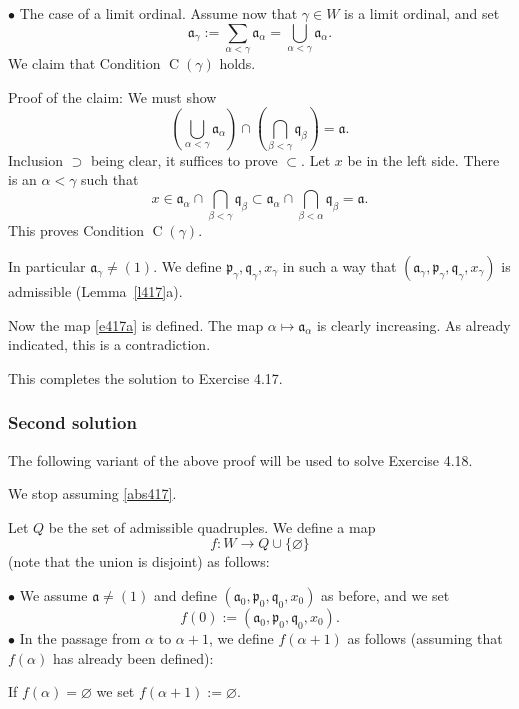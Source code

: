 \documentclass[parskip=half,fontsize=12pt]{scrartcl}%
\newcommand{\oo}{\operatorname}\newcommand{\ooo}{\operatorname*}
\newcommand{\mf}{\mathfrak}
\newcommand{\aaa}{\mf a}
\newcommand{\ppp}{\mf p}
\newcommand{\qqq}{\mf q}
\newcommand{\bu}{\bullet}
\begin{document}
$\bu$ The case of a limit ordinal. Assume now that $\gamma\in W$ is a limit ordinal, and set 
$$
\aaa_\gamma:=\sum_{\alpha<\gamma}\aaa_\alpha=\bigcup_{\alpha<\gamma}\aaa_\alpha.
$$ 
We claim that Condition $\oo C(\gamma)$ holds.

Proof of the claim: We must show 
$$
\left(\bigcup_{\alpha<\gamma}\aaa_\alpha\right)\cap\left(\bigcap_{\beta<\gamma}\qqq_\beta\right)=\aaa.
$$ 
Inclusion $\supset$ being clear, it suffices to prove $\subset$. Let $x$ be in the left side. There is an $\alpha<\gamma$ such that 
$$
x\in\aaa_\alpha\cap\bigcap_{\beta<\gamma}\qqq_\beta\subset\aaa_\alpha\cap\bigcap_{\beta<\alpha}\qqq_\beta=\aaa.
$$ 
This proves Condition $\oo C(\gamma)$. 

In particular $\aaa_\gamma\ne(1)$. We define $\ppp_\gamma,\qqq_\gamma,x_\gamma$ in such a way that $(\aaa_\gamma,\ppp_\gamma,\qqq_\gamma,x_\gamma)$ is admissible (Lemma~\ref{l417}a).

Now the map \eqref{e417a} is defined. The map $\alpha\mapsto\aaa_\alpha$ is clearly increasing. As already indicated, this is a contradiction.

This completes the solution to Exercise 4.17. %

\subsubsection{Second solution}\label{for418}%

The following variant of the above proof will be used to solve Exercise 4.18. %

We stop assuming \eqref{abs417}. 

Let $Q$ be the set of admissible quadruples. We define a map 
$$
f:W\to Q\cup\{\varnothing\}
$$ 
(note that the union is disjoint) as follows:

$\bu$ We assume $\aaa\ne(1)$ and define $(\aaa_0,\ppp_0,\qqq_0,x_0)$ as before, and we set 
$$
f(0):=(\aaa_0,\ppp_0,\qqq_0,x_0).
$$
$\bu$ In the passage from $\alpha$ to $\alpha+1$, we define $f(\alpha+1)$ as follows (assuming that $f(\alpha)$ has already been defined):

If $f(\alpha)=\varnothing$ we set $f(\alpha+1):=\varnothing$. 
\end{document}
